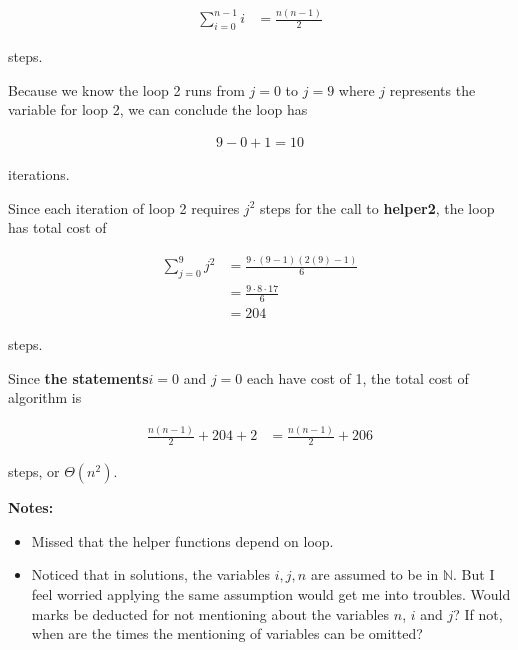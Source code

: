 \documentclass[12pt]{article}
\begin{document}
\begin{enumerate}[a.]
\begin{mdframed}
        \color{red}
        \begin{align}
            \sum\limits_{i=0}^{n-1} i &= \frac{n(n-1)}{2}
        \end{align}
        \color{black}

        steps.

        \bigskip

        Because we know the loop 2 runs from $j = 0$ to $j = 9$ \color{red}where $j$
        represents the variable for loop 2\color{black}, we can conclude
        the loop has

        \begin{align}
            9 - 0 + 1 = 10
        \end{align}

        iterations.

        \bigskip

        Since each iteration of loop 2 requires \color{red}\textbf{$j^2$}\color{black}
        \:steps for the call to \textbf{helper2}, the loop has total cost of

        \color{red}
        \begin{align}
            \sum\limits_{j=0}^{9} j^2 &= \frac{9 \cdot (9 - 1)(2(9) - 1)}{6}\\
            &= \frac{9 \cdot 8 \cdot 17}{6}\\
            &= 204
        \end{align}
        \color{black}

        steps.

        \bigskip

        Since \color{red}\textbf{the statements}\color{black}\:$i = 0$ and $j = 0$
        each have cost of 1, the total cost of algorithm is

        \color{red}
        \begin{align}
            \frac{n(n-1)}{2} + 204 + 2 &= \frac{n(n-1)}{2} + 206
        \end{align}
        \color{black}

        steps, or $\Theta(n^2)$.

    \end{mdframed}

    \textbf{Notes:}

    \begin{itemize}
        \item Missed that the helper functions depend on loop.
        \item Noticed that in solutions, the variables $i,j,n$ are assumed to be
        in $\mathbb{N}$. But I feel worried applying the same assumption would
        get me into troubles. Would marks be deducted for not mentioning about the variables
        $n$, $i$ and $j$? If not, when are the times the mentioning of
        variables can be omitted?

    \end{itemize}

\end{enumerate}
\end{document}
